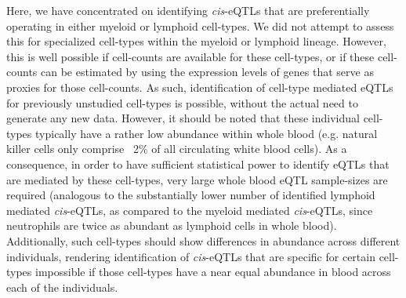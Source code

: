   Here, we have concentrated on identifying \emph{cis}-eQTLs that are preferentially operating in either 
  myeloid or lymphoid cell-types. We did not attempt to assess this for specialized cell-types within 
  the myeloid or lymphoid lineage. However, this is well possible if cell-counts are available for 
  these cell-types, or if these cell-counts can be estimated by using the expression levels of genes 
  that serve as proxies for those cell-counts. As such, identification of cell-type mediated eQTLs 
  for previously unstudied cell-types is possible, without the actual need to generate any new data. 
  However, it should be noted that these individual cell-types typically have a rather low abundance 
  within whole blood (e.g. natural killer cells only comprise ~2\% of all circulating white blood 
  cells). As a consequence, in order to have sufficient statistical power to identify eQTLs that are 
  mediated by these cell-types, very large whole blood eQTL sample-sizes are required (analogous to 
  the substantially lower number of identified lymphoid mediated \emph{cis}-eQTLs, as compared to the myeloid 
  mediated \emph{cis}-eQTLs, since neutrophils are twice as abundant as lymphoid cells in whole blood). 
  Additionally, such cell-types should show differences in abundance across different individuals, 
  rendering identification of \emph{cis}-eQTLs that are specific for certain cell-types impossible if those 
  cell-types have a near equal abundance in blood across each of the individuals.

